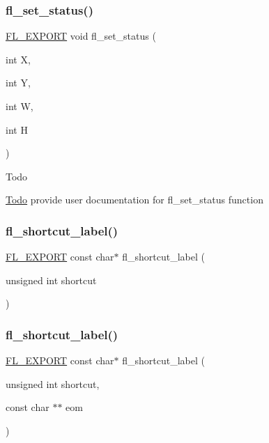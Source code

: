 \subsubsection{\texorpdfstring{fl\+\_\+set\+\_\+status()}{fl\_set\_status()}}
{\footnotesize\ttfamily \hyperlink{_fl___export_8_h_aa9ba29a18aee9d738370a06eeb4470fc}{F\+L\+\_\+\+E\+X\+P\+O\+RT} void fl\+\_\+set\+\_\+status (\begin{DoxyParamCaption}\item[{int}]{X,  }\item[{int}]{Y,  }\item[{int}]{W,  }\item[{int}]{H }\end{DoxyParamCaption})}

\begin{DoxyRefDesc}{Todo}
\item[\hyperlink{todo__todo000013}{Todo}]provide user documentation for fl\+\_\+set\+\_\+status function \end{DoxyRefDesc}
\mbox{\label{group__fl__drawings_gadfd8bd4a9143e4238da84d031bfd1815}} 
\subsubsection{\texorpdfstring{fl\+\_\+shortcut\+\_\+label()}{fl\_shortcut\_label()}\hspace{0.1cm}{\footnotesize\ttfamily [1/2]}}
{\footnotesize\ttfamily \hyperlink{_fl___export_8_h_aa9ba29a18aee9d738370a06eeb4470fc}{F\+L\+\_\+\+E\+X\+P\+O\+RT} const char$\ast$ fl\+\_\+shortcut\+\_\+label (\begin{DoxyParamCaption}\item[{unsigned int}]{shortcut }\end{DoxyParamCaption})}

\mbox{\label{group__fl__drawings_ga035deb6aa074fd5df1419412ba370410}} 
\subsubsection{\texorpdfstring{fl\+\_\+shortcut\+\_\+label()}{fl\_shortcut\_label()}\hspace{0.1cm}{\footnotesize\ttfamily [2/2]}}
{\footnotesize\ttfamily \hyperlink{_fl___export_8_h_aa9ba29a18aee9d738370a06eeb4470fc}{F\+L\+\_\+\+E\+X\+P\+O\+RT} const char$\ast$ fl\+\_\+shortcut\+\_\+label (\begin{DoxyParamCaption}\item[{unsigned int}]{shortcut,  }\item[{const char $\ast$$\ast$}]{eom }\end{DoxyParamCaption})}

